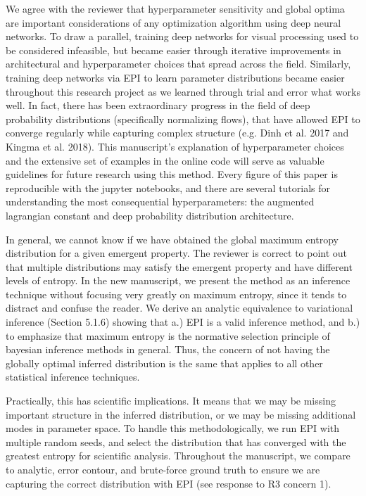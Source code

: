 \documentclass[11pt,a4paper]{article}
\begin{document}
We agree with the reviewer that hyperparameter sensitivity and global optima are important considerations of any optimization algorithm using deep neural networks.  To draw a parallel, training deep networks for visual processing used to be considered infeasible, but became easier through iterative improvements in architectural and hyperparameter choices that spread across the field.  
Similarly, training deep networks via EPI to learn parameter distributions became easier throughout this research project as we learned through trial and error what works well.  
In fact, there has been extraordinary progress in the field of deep probability distributions (specifically normalizing flows), that have allowed EPI to converge regularly while capturing complex structure (e.g. Dinh et al. 2017 and Kingma et al. 2018).  
This manuscript's explanation of hyperparameter choices and the extensive set of examples in the online code will serve as valuable guidelines for future research using this method.
Every figure of this paper is reproducible with the jupyter notebooks, and there are several tutorials for understanding the most consequential hyperparameters: the augmented lagrangian constant and deep probability distribution architecture.  

In general, we cannot know if we have obtained the global maximum entropy distribution for a given emergent property.  
The reviewer is correct to point out that multiple distributions may satisfy the emergent property and have different levels of entropy.  
In the new manuscript, we present the method as an inference technique without focusing very greatly on maximum entropy, since it tends to distract and confuse the reader.  
We derive an analytic equivalence to variational inference (Section 5.1.6) showing that a.) EPI is a valid inference method, and b.) to emphasize that maximum entropy is the normative selection principle of bayesian inference methods in general. 
Thus, the concern of not having the globally optimal inferred distribution is the same that applies to all other statistical inference techniques.

Practically, this has scientific implications.  
It means that we may be missing important structure in the inferred distribution, or we may be missing additional modes in parameter space.  
To handle this methodologically, we run EPI with multiple random seeds, and select the distribution that has converged with the greatest entropy for scientific analysis.
Throughout the manuscript, we compare to analytic, error contour, and brute-force ground truth to ensure we are capturing the correct distribution with EPI (see response to R3 concern 1).
\end{document}
